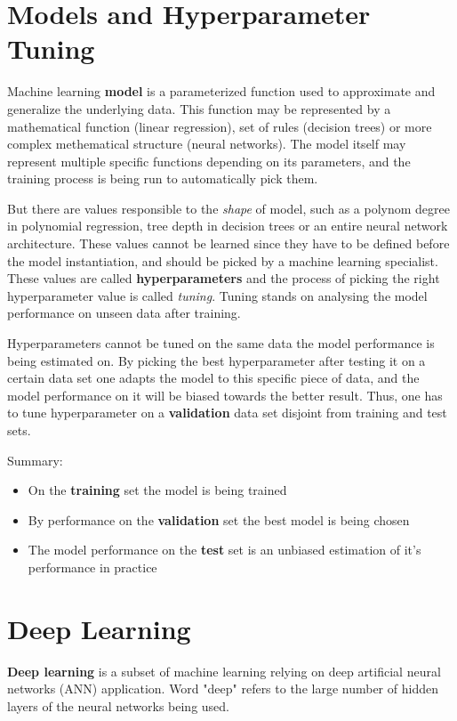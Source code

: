 \documentclass[thesis=B,english]{FITthesis}[2019/12/23]
\begin{document}
\section{Models and Hyperparameter Tuning}

Machine learning \textbf{model} is a parameterized function used to approximate and generalize the underlying data. This function may be represented by a mathematical function (linear regression), set of rules (decision trees) or more complex methematical structure (neural networks). The model itself may represent multiple specific functions depending on its parameters, and the training process is being run to automatically pick them.

But there are values responsible to the \textit{shape} of model, such as a polynom degree in polynomial regression, tree depth in decision trees or an entire neural network architecture. These values cannot be learned since they have to be defined before the model instantiation, and should be picked by a machine learning specialist. These values are called \textbf{hyperparameters} and the process of picking the right hyperparameter value is called \textit{tuning}. Tuning stands on analysing the model performance on unseen data after training.

Hyperparameters cannot be tuned on the same data the model performance is being estimated on. By picking the best hyperparameter after testing it on a certain data set one adapts the model to this specific piece of data, and the model performance on it will be biased towards the better result. Thus, one has to tune hyperparameter on a \textbf{validation} data set disjoint from training and test sets.

Summary:
\begin{itemize}
	\item On the \textbf{training} set the model is being trained
	\item By performance on the \textbf{validation} set the best model is being chosen
	\item The model performance on the \textbf{test} set is an unbiased estimation of it's performance in practice
\end{itemize}

\section{Deep Learning}

\textbf{Deep learning} is a subset of machine learning relying on deep artificial neural networks (ANN) application. Word "deep" refers to the large number of hidden layers of the neural networks being used.
\end{document}

